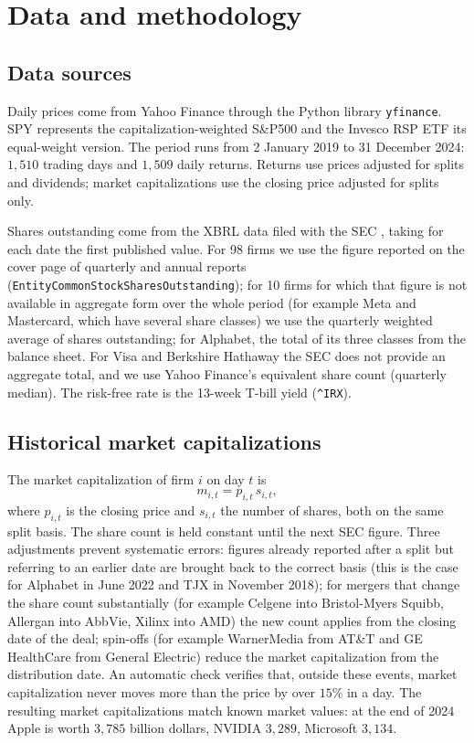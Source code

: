 \documentclass[12pt, a4paper]{article}
\begin{document}
\section{Data and methodology}

\subsection{Data sources}

Daily prices come from Yahoo Finance through the Python library \texttt{yfinance}. SPY represents the capitalization-weighted S\&P500 and the Invesco RSP ETF its equal-weight version. The period runs from 2 January 2019 to 31 December 2024: $1{,}510$ trading days and $1{,}509$ daily returns. Returns use prices adjusted for splits and dividends; market capitalizations use the closing price adjusted for splits only.

Shares outstanding come from the XBRL data filed with the SEC \citep{secedgar}, taking for each date the first published value. For 98 firms we use the figure reported on the cover page of quarterly and annual reports (\texttt{EntityCommonStockSharesOutstanding}); for 10 firms for which that figure is not available in aggregate form over the whole period (for example Meta and Mastercard, which have several share classes) we use the quarterly weighted average of shares outstanding; for Alphabet, the total of its three classes from the balance sheet. For Visa and Berkshire Hathaway the SEC does not provide an aggregate total, and we use Yahoo Finance's equivalent share count (quarterly median). The risk-free rate is the 13-week T-bill yield (\texttt{\^{}IRX}).

\subsection{Historical market capitalizations}

The market capitalization of firm $i$ on day $t$ is
\begin{equation}
  m_{i,t} = p_{i,t}\, s_{i,t},
\end{equation}
where $p_{i,t}$ is the closing price and $s_{i,t}$ the number of shares, both on the same split basis. The share count is held constant until the next SEC figure. Three adjustments prevent systematic errors: figures already reported after a split but referring to an earlier date are brought back to the correct basis (this is the case for Alphabet in June 2022 and TJX in November 2018); for mergers that change the share count substantially (for example Celgene into Bristol-Myers Squibb, Allergan into AbbVie, Xilinx into AMD) the new count applies from the closing date of the deal; spin-offs (for example WarnerMedia from AT\&T and GE HealthCare from General Electric) reduce the market capitalization from the distribution date. An automatic check verifies that, outside these events, market capitalization never moves more than the price by over $15\%$ in a day. The resulting market capitalizations match known market values: at the end of 2024 Apple is worth $3{,}785$ billion dollars, NVIDIA $3{,}289$, Microsoft $3{,}134$.
\end{document}
